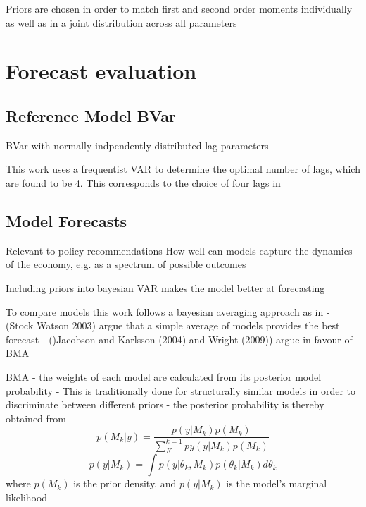 \documentclass[12pt,a4paper,english]{article} %
\let\oldsection\section
\renewcommand\section{\clearpage\oldsection}
\begin{document}
	
	

	
		
	Priors are chosen in order to match first and second order moments individually as well as in a joint distribution across all parameters \cite{del_negro_forming_2008}
	


	
	
	
	
	\section{Forecast evaluation}
	
	\subsection{Reference Model BVar}
	\cite{schorfheide_loss_2000}
	
	BVar with normally indpendently distributed lag parameters \cite{chin_bayesian_2019}
	
	This work uses a frequentist VAR to determine the optimal number of lags, which are found to be 4. This corresponds to the choice of four lags in \cite{chin_bayesian_2019}
	
	
	\subsection{Model Forecasts}
	Relevant to policy recommendations
	How well can models capture the dynamics of the economy, e.g. as a spectrum of possible outcomes
	
	Including priors into bayesian VAR makes the model better at forecasting \cite{chin_bayesian_2019}
	
	
	To compare models this work follows a bayesian averaging approach as in \cite{chin_bayesian_2019}
	- (Stock Watson 2003) argue that a simple average of models provides the best forecast
	- ()Jacobson and Karlsson (2004) and Wright (2009)) argue in favour of BMA
	
	
	BMA
	- the weights of each model are calculated from its posterior model probability \cite{chin_bayesian_2019}
	- This is traditionally done for structurally similar models in order to discriminate between different priors
	- the posterior probability is thereby obtained from \cite{chin_bayesian_2019}
	\[
		p(M_k | y) = \frac{p(y | M_k) p(M_k)}{\sum_{K}^{k=1} py(y | M_k) p(M_k)}
	\]
	\[
		p(y | M_k) = \int p( y| \theta_k, M_k) p(\theta_k | M_k) d \theta_k
	\]
	where $p(M_k)$ is the prior density, and $p(y | M_k)$ is the model's marginal likelihood
	
\end{document}
